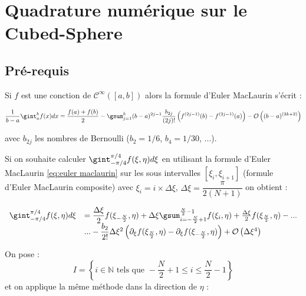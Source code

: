 
\chapter{Quadrature numérique sur le Cubed-Sphere}


\section{Pré-requis} %

Si $f$ est une conction de $\mathcal{C}^{\infty}([a,b])$ alors la formule d'Euler MacLaurin s'écrit :

\begin{equation}
\dfrac{1}{b-a} \gint_a^b f(x)dx = \dfrac{f(a)+f(b)}{2} - \gsum_{j=1}^k (b-a)^{2j-1} \dfrac{b_{2j}}{(2j)!} \left( f^{(2j-1)}(b) - f^{(2j-1)}(a) \right) - \mathcal{O}\left( (b-a)^{(2k+2)} \right)
\label{eq:euler maclaurin}
\end{equation}

avec $b_{2j}$ les nombres de Bernoulli ($b_2=1/6$, $b_4=1/30$, ...).

Si on souhaite calculer $\gint_{-\pi/4}^{\pi/4} f(\xi,\eta)d\xi$ en utilisant la formule d'Euler MacLaurin \eqref{eq:euler maclaurin} sur les sous intervalles $[\xi_i, \xi_{i+1}]$ (formule d'Euler MacLaurin composite) avec $\xi_i= i \times \Delta \xi$, $\Delta \xi = \dfrac{\pi}{2(N+1)}$ on obtient :

\begin{equation}
\begin{array}{rl}
\gint_{-\pi/4}^{\pi/4} f(\xi,\eta)d\xi & = \dfrac{\Delta \xi}{2} f(\xi_{-\frac{N}{2}},\eta) +  \Delta \xi \gsum_{i=-\frac{N}{2}+1}^{\frac{N}{2}-1} f(\xi_i,\eta) + \frac{\Delta \xi}{2} f(\xi_{\frac{N}{2}},\eta)- ...\\
                                       & ... - \dfrac{b_2}{2!} \Delta \xi^2 \left( \partial_\xi f(\xi_{\frac{N}{2}},\eta) - \partial_\xi f(\xi_{-\frac{N}{2}},\eta) \right) + \mathcal{O} \left( \Delta \xi ^4 \right)
\end{array}
\end{equation}

On pose : $$I = \left\lbrace i\in\mathbb{N} \text{ tels que } -\frac{N}{2}+1 \leq i \leq \frac{N}{2}-1 \right\rbrace$$ et on applique la même méthode dans la direction de $\eta$  :


